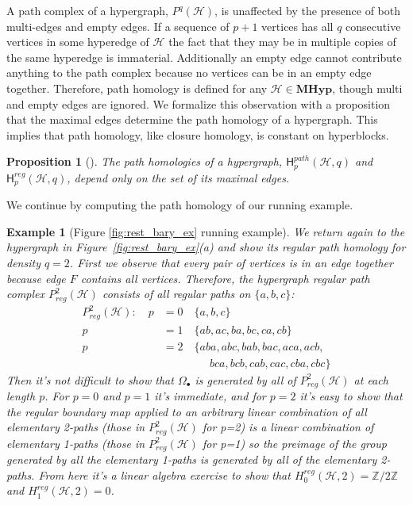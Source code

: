 \documentclass{amsart}
\newtheorem{example}[theorem]{Example}
\newtheorem{proposition}[theorem]{Proposition}
\newcommand{\Z}{\mathbb{Z}}
\newcommand{\MHyp}{\mathrm{\textbf{MHyp}}}
\newcommand{\Hgroup}	     {\mathsf{H}}
\renewcommand{\H}{\mathcal{H}}
\begin{document}
A path complex of a hypergraph, $P^q(\H)$, is unaffected by the presence of both multi-edges and empty edges. If a sequence of $p+1$ vertices has all $q$ consecutive vertices in some hyperedge of $\H$ the fact that they may be in multiple copies of the same hyperedge is immaterial. Additionally an empty edge cannot contribute anything to the path complex because no vertices can be in an empty edge together.
Therefore, path homology is defined for any $\H \in \MHyp$, though multi and empty edges are ignored.
We formalize this observation with a proposition that the maximal edges determine the path homology of a hypergraph. This implies that path homology, like closure homology, is constant on hyperblocks. 
\begin{proposition}[{\cite[Proposition 5.6]{GrigoryanJimenezMuranov2019}}]\label{prop:path_constant_hyperblock}
    The path homologies of a hypergraph, $\Hgroup_p^{path}(\H, q)$ and $\Hgroup^{reg}_p(\H, q)$, depend only on the set of its maximal edges.
\end{proposition}

We continue by computing the path homology of our running example.

\begin{example}[Figure \ref{fig:rest_bary_ex} running example]
We return again to the hypergraph in Figure~\ref{fig:rest_bary_ex}(a) and show its regular path homology for density $q=2$. First we observe that every pair of vertices is in an edge together because edge $F$ contains all vertices. Therefore, the hypergraph regular path complex $P^2_{reg}(\H)$ consists of all regular paths on $\{a, b, c\}$:
\begin{align*}
    P^2_{reg}(\H) : \quad p &= 0 \quad \{a, b, c\}\\
                    p &= 1 \quad \{ab, ac, ba, bc, ca, cb\}\\
                    p &= 2 \quad \{aba, abc, bab, bac, aca, acb,\\
                    \phantom{p}&\phantom{= 2 \quad \{,,}  bca, bcb, cab, cac, cba, cbc\}
\end{align*}  
Then it's not difficult to show that $\Omega_\bullet$ is generated by all of $P^2_{reg}(\H)$ at each length $p$. For $p=0$ and $p=1$ it's immediate, and for $p=2$ it's easy to show that the regular boundary map applied to an arbitrary linear combination of all elementary 2-paths (those in $P^2_{reg}(\H)$ for p=2) is a linear combination of elementary 1-paths (those in $P^2_{reg}(\H)$ for p=1) so the preimage of the group generated by all the elementary 1-paths is generated by all of the elementary 2-paths.
From here it's a linear algebra exercise to show that $H_0^{reg}(\H, 2) = \Z/2\Z$ and $H_1^{reg}(\H, 2) = 0$.
\end{example}
\end{document}
